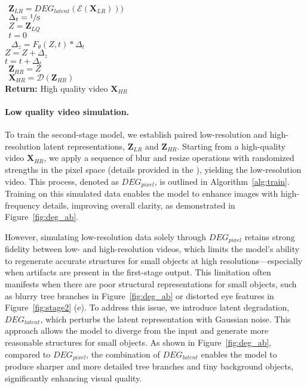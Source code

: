 \begin{center}
\begin{minipage}[t]{0.5\linewidth}
{\begin{algorithm}[H]
{    $\:\: \mathbf{Z}_{LR} = DEG_{latent}(\mathcal{E}(\mathbf{X}_{LR})))$ \\
    $\:\: \Delta_{t} = \sfrac{1}{S} $ \\
    $\:\:  Z =  \mathbf{Z}_{LQ} $ \\
    $\:\:  t = 0 $ \\
    $\:\:$ 
    {
        $\Delta_z = F_\theta\left(Z, t\right) * \Delta_{t}$ \\
        $Z = Z + \Delta_z$ \\
        $t = t + \Delta_t$ \\
    }
     $\:\: \mathbf{Z}_{HR} = Z$ \\
     $\:\: \mathbf{X}_{HR} = \mathcal{D}(\mathbf{Z}_{HR})$ \\
    \textbf{Return: } High quality video $\mathbf{X}_{HR}$
    }
  \end{algorithm}
  }
\end{minipage}
\end{center}






\label{exp:simulation} \paragraph{Low quality video simulation.} 


To train the second-stage model, we establish paired low-resolution and high-resolution latent representations, $\mathbf{Z}_{LR}$ and $\mathbf{Z}_{HR}$. Starting from a high-quality video $\mathbf{X}_{HR}$, we apply a sequence of blur and resize operations with randomized strengths in the pixel space (details provided in the \supp), yielding the low-resolution video. This process, denoted as $DEG_{pixel}$, is outlined in Algorithm~\ref{alg:train}. Training on this simulated data enables the model to enhance images with high-frequency details, improving overall clarity, as demonstrated in Figure~\ref{fig:deg_ab}.

However, simulating low-resolution data solely through $DEG_{pixel}$ retains strong fidelity between low- and high-resolution videos, which limits the model's ability to regenerate accurate structures for small objects at high resolutions—especially when artifacts are present in the first-stage output. This limitation often manifests when there are poor structural representations for small objects, such as blurry tree branches in Figure~\ref{fig:deg_ab} or distorted eye features in Figure~\ref{fig:stage2} (e). To address this issue, we introduce latent degradation, $DEG_{latent}$, which perturbs the latent representation with Gaussian noise. This approach allows the model to diverge from the input and generate more reasonable structures for small objects. As shown in Figure~\ref{fig:deg_ab}, compared to $DEG_{pixel}$, the combination of $DEG_{latent}$ enables the model to produce sharper and more detailed tree branches and tiny background objects, significantly enhancing visual quality.

